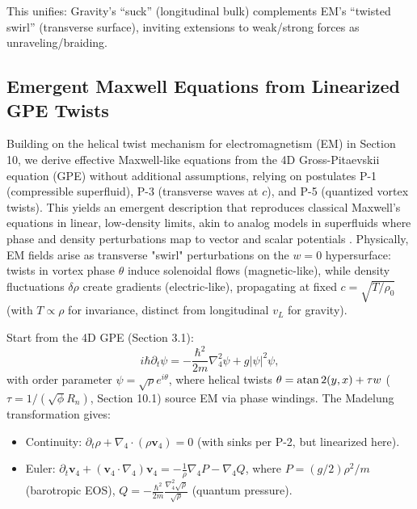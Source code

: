 \documentclass{article}
\begin{document}
This unifies: Gravity's ``suck'' (longitudinal bulk) complements EM's ``twisted swirl'' (transverse surface), inviting extensions to weak/strong forces as unraveling/braiding.

\subsection{Emergent Maxwell Equations from Linearized GPE Twists}

Building on the helical twist mechanism for electromagnetism (EM) in Section 10, we derive effective Maxwell-like equations from the 4D Gross-Pitaevskii equation (GPE) without additional assumptions, relying on postulates P-1 (compressible superfluid), P-3 (transverse waves at \(c\)), and P-5 (quantized vortex twists). This yields an emergent description that reproduces classical Maxwell's equations in linear, low-density limits, akin to analog models in superfluids where phase and density perturbations map to vector and scalar potentials \cite{unruh1981experimental, visser1998acoustic}. Physically, EM fields arise as transverse "swirl" perturbations on the \(w=0\) hypersurface: twists in vortex phase \(\theta\) induce solenoidal flows (magnetic-like), while density fluctuations \(\delta \rho\) create gradients (electric-like), propagating at fixed \(c = \sqrt{T / \rho_0}\) (with \(T \propto \rho\) for invariance, distinct from longitudinal \(v_L\) for gravity).

Start from the 4D GPE (Section 3.1):
\[
i \hbar \partial_t \psi = -\frac{\hbar^2}{2 m} \nabla_4^2 \psi + g |\psi|^2 \psi,
\]
with order parameter \(\psi = \sqrt{\rho} e^{i \theta}\), where helical twists \(\theta = \atan2(y,x) + \tau w\) (\(\tau = 1 / (\sqrt{\phi} R_n)\), Section 10.1) source EM via phase windings. The Madelung transformation gives:
\begin{itemize}
  \item Continuity: \(\partial_t \rho + \nabla_4 \cdot (\rho \mathbf{v}_4) = 0\) (with sinks per P-2, but linearized here).
  \item Euler: \(\partial_t \mathbf{v}_4 + (\mathbf{v}_4 \cdot \nabla_4) \mathbf{v}_4 = -\frac{1}{\rho} \nabla_4 P - \nabla_4 Q\), where \(P = (g/2) \rho^2 / m\) (barotropic EOS), \(Q = -\frac{\hbar^2}{2 m} \frac{\nabla_4^2 \sqrt{\rho}}{\sqrt{\rho}}\) (quantum pressure).
\end{itemize}
\end{document}

